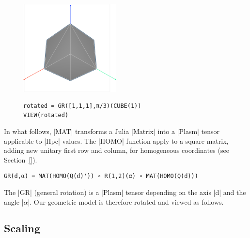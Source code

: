 \begin{figure}[htbp] %
\begin{minipage}[c]{0.35\textwidth}
   \includegraphics[width=2in]{chapter-04/figs/GRcube} 
\end{minipage}
\hfill
\begin{minipage}[c]{0.55\textwidth}
\begin{lstlisting}[language=JuliaLocal, style=julia, mathescape=true]
rotated = GR([1,1,1],π/3)(CUBE(1))
VIEW(rotated)
\end{lstlisting}
\end{minipage}
\end{figure}


\begin{coding}
In what follows, |MAT| transforms a Julia |Matrix| into a |Plasm| tensor applicable to |Hpc| values. 
The |HOMO| function apply to  a square matrix, adding new unitary first row and column, for homogeneous coordinates (see Section~\ref{}).  
\begin{lstlisting}[language=JuliaLocal, style=julia, mathescape=true]
GR(d,α) = MAT(HOMO(Q(d)')) ∘ R(1,2)(α) ∘ MAT(HOMO(Q(d)))
\end{lstlisting}
The |GR| (general rotation) is a |Plasm| tensor depending on the axis |d| and the angle |$\alpha$|. 
Our geometric model is therefore rotated and viewed as follows.
\end{coding}



\subsection*{Scaling}\label{sect:4-2-2}

